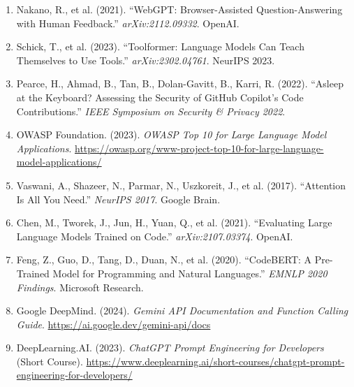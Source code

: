 \documentclass[a4paper,11pt]{article}
\begin{document}
\begin{enumerate}
    \item Nakano, R., et al. (2021). ``WebGPT: Browser-Assisted Question-Answering with Human Feedback.'' \textit{arXiv:2112.09332}. OpenAI.

    \item Schick, T., et al. (2023). ``Toolformer: Language Models Can Teach Themselves to Use Tools.'' \textit{arXiv:2302.04761}. NeurIPS 2023.

    \item Pearce, H., Ahmad, B., Tan, B., Dolan-Gavitt, B., Karri, R. (2022). ``Asleep at the Keyboard? Assessing the Security of GitHub Copilot's Code Contributions.'' \textit{IEEE Symposium on Security \& Privacy 2022}.

    \item OWASP Foundation. (2023). \textit{OWASP Top 10 for Large Language Model Applications}. \url{https://owasp.org/www-project-top-10-for-large-language-model-applications/}

    \item Vaswani, A., Shazeer, N., Parmar, N., Uszkoreit, J., et al. (2017). ``Attention Is All You Need.'' \textit{NeurIPS 2017}. Google Brain.

    \item Chen, M., Tworek, J., Jun, H., Yuan, Q., et al. (2021). ``Evaluating Large Language Models Trained on Code.'' \textit{arXiv:2107.03374}. OpenAI.

    \item Feng, Z., Guo, D., Tang, D., Duan, N., et al. (2020). ``CodeBERT: A Pre-Trained Model for Programming and Natural Languages.'' \textit{EMNLP 2020 Findings}. Microsoft Research.

    \item Google DeepMind. (2024). \textit{Gemini API Documentation and Function Calling Guide}. \url{https://ai.google.dev/gemini-api/docs}

    \item DeepLearning.AI. (2023). \textit{ChatGPT Prompt Engineering for Developers} (Short Course). \url{https://www.deeplearning.ai/short-courses/chatgpt-prompt-engineering-for-developers/}
\end{enumerate}
\end{document}
